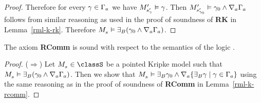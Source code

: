 \begin{proof}
Therefore for every $\gamma \in \Gamma_a$ we have ${M^{\prime}_{{s}^{\prime}_\gamma}} \vDash \gamma$.
Then ${M^{\prime}_{{s}^{\prime}_{\gamma_0}}} \vDash \gamma_0 \land \nabla_{a} \Gamma_a$ follows from similar reasoning as used in the proof of soundness of {\bf RK} in Lemma~\ref{rml-k-rk}.
Therefore $\kPModel{\kStateS} \entails \somerefsBs (\gamma_0 \land \coversA \Gamma_\agentA)$.
\end{proof}

\begin{lemma}
The axiom {\bf RComm} is sound with respect to the semantics of the logic \logicRmlS{}.
\end{lemma}

\begin{proof}
($\Rightarrow$)
Let $\kPModel{\kStateS} \in \classS$ be a pointed Kripke model such that $\kPModel{\kStateS} \entails \somerefsBs (\gamma_0 \land \coversA \Gamma_\agentA)$.
Then we show that $\kPModel{\kStateS} \entails \somerefsBs \gamma_0 \land \coversA \{\somerefsBs \gamma \mid \gamma \in \Gamma_\agentA\}$ using the same reasoning as in the proof of soundness of {\bf RComm} in Lemma~\ref{rml-k-rcomm}.


\end{proof}
